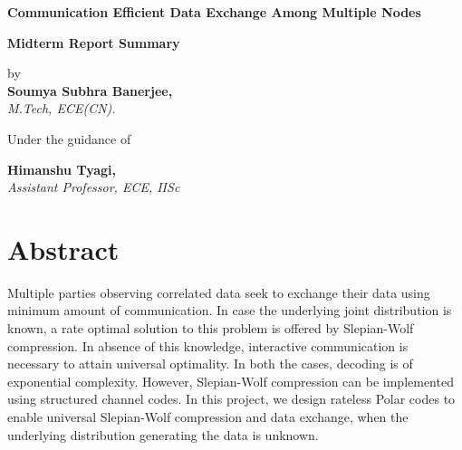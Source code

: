\documentclass[
11pt, %
a4paper, %
oneside, %
headinclude,footinclude, %
BCOR5mm, %
]{scrartcl}
\begin{document}

\begin{center}
\begin{huge}
\vspace{1 in}
{\bf  Communication Efficient Data Exchange Among Multiple Nodes}\\  
\end{huge}
\vspace{1 cm}
\begin{large}
\textbf{Midterm Report Summary}\\
\end{large}
\begin{large}
\vspace{0.5cm}
{by\\}
\vspace{0.1cm}
{\textbf{Soumya Subhra Banerjee,} \\ \textit{M.Tech, ECE(CN).} }
\end{large}

\vspace{.2in}

\begin{large}
{ Under the guidance of}\\
\end{large}
\vspace{0.2cm}
\begin{large}
{\textbf{Himanshu Tyagi,}\\ \textit{Assistant Professor, ECE, IISc}}\end{large}
\vspace{1.0cm}

\end{center}






\section*{Abstract}
Multiple parties observing correlated data seek to exchange their data using minimum
amount of communication. In case the underlying joint distribution is known, a rate optimal solution to this problem
is offered by Slepian-Wolf compression. In absence of this knowledge, interactive
communication is necessary to attain universal optimality. In both the cases, decoding
is of exponential complexity. However, Slepian-Wolf compression can be implemented
using structured channel codes. In this project, we design rateless Polar codes to enable universal Slepian-Wolf compression and data exchange, when the underlying distribution generating the data is unknown.
 
\end{document}
